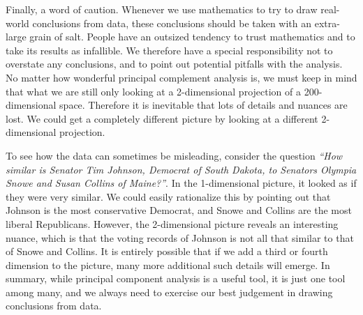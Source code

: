 Finally, a word of caution. Whenever we use mathematics to try to draw
real-world conclusions from data, these conclusions should be taken
with an extra-large grain of salt. People have an outsized tendency to
trust mathematics and to take its results as infallible. We therefore
have a special responsibility not to overstate any conclusions, and to
point out potential pitfalls with the analysis. No matter how
wonderful principal complement analysis is, we must keep in mind that
what we are still only looking at a 2-dimensional projection of a
200-dimensional space. Therefore it is inevitable that lots of details
and nuances are lost. We could get a completely different picture by
looking at a different 2-dimensional projection.

To see how the data can sometimes be misleading, consider the question
{\em ``How similar is Senator Tim Johnson, Democrat of South Dakota,
  to Senators Olympia Snowe and Susan Collins of Maine?''}. In the
1-dimensional picture, it looked as if they were very similar. We
could easily rationalize this by pointing out that Johnson is the most
conservative Democrat, and Snowe and Collins are the most liberal
Republicans. However, the 2-dimensional picture reveals an interesting
nuance, which is that the voting records of Johnson is not all that
similar to that of Snowe and Collins. It is entirely possible that if
we add a third or fourth dimension to the picture, many more
additional such details will emerge. In summary, while principal
component analysis is a useful tool, it is just one tool among many,
and we always need to exercise our best judgement in drawing
conclusions from data.
